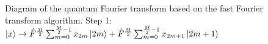 \begin{figure}
\centering



\caption{Diagram of the quantum Fourier transform based on the fast Fourier transform algorithm. Step 1: 
$\ket{x} \rightarrow
\hat{F}^{\frac{M}{2}} \sum_{m = 0}^{\frac{M}{2} - 1}x_{2m} \ket{2m} +
\hat{F}^{\frac{M}{2}} \sum_{m = 0}^{\frac{M}{2} - 1}x_{2m + 1} \ket{2m+1}$}
\label{figQuantCompQuantFourier1}
\end{figure}